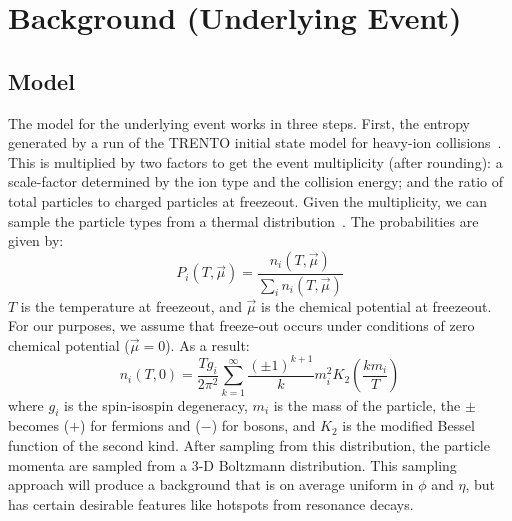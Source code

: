 \documentclass[11pt]{article}
\begin{document}
\section{Background (Underlying Event)}

\subsection{Model}
The model for the underlying event works in three steps. First, the entropy generated by a run of the TRENTO initial state model for heavy-ion collisions~\cite{Moreland:2014oya}. This is multiplied by two factors to get the event multiplicity (after rounding): a scale-factor determined by the ion type and the collision energy; and the ratio of total particles to charged particles at freezeout. Given the multiplicity, we can sample the particle types from a thermal distribution~\cite{BraunMunzinger:2003zd}. The probabilities are given by:
\begin{equation}\label{eq:particle_prob}
    P_i(T, \vec{\mu}) = \frac{n_i(T, \vec{\mu})}{\sum_{i} n_i(T, \vec{\mu})}
\end{equation}
$T$ is the temperature at freezeout, and $\vec{\mu}$ is the chemical potential at freezeout. For our purposes, we assume that freeze-out occurs under conditions of zero chemical potential ($\vec{\mu} = 0$). As a result:
\begin{equation}\label{eq:density_definition}
    n_i(T, 0) = \frac{T g_i}{2 \pi^2} \sum_{k=1}^{\infty} \frac{(\pm 1)^{k + 1}}{k} m_i^2 K_2(\frac{k m_i}{T})
\end{equation}
where $g_i$ is the spin-isospin degeneracy, $m_i$ is the mass of the particle, the $\pm$ becomes ($+$) for fermions and ($-$) for bosons, and $K_2$ is the modified Bessel function of the second kind. After sampling from this distribution, the particle momenta are sampled from a 3-D Boltzmann distribution. This sampling approach will produce a background that is on average uniform in $\phi$ and $\eta$, but has certain desirable features like hotspots from resonance decays.
\end{document}

